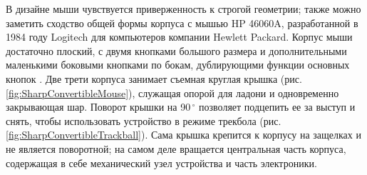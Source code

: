 \documentclass[11pt, a4paper]{article}
\begin{document}
В дизайне мыши чувствуется приверженность к строгой геометрии; также можно заметить сходство общей формы корпуса с мышью HP 46060A, разработанной в 1984 году Logitech для компьютеров компании Hewlett Packard. Корпус мыши достаточно плоский, с двумя кнопками большого размера и дополнительными маленькими боковыми кнопками по бокам, дублирующими функции основных кнопок \cite{JapaneseVintage}. Две трети корпуса занимает съемная круглая крышка (рис. \ref{fig:SharpConvertibleMouse}), служащая опорой для ладони и одновременно закрывающая шар. Поворот крышки на 90\,$^\circ$ позволяет подцепить ее за выступ и снять, чтобы использовать устройство в режиме трекбола (рис. \ref{fig:SharpConvertibleTrackball}). Сама крышка крепится к корпусу на защелках и не является поворотной; на самом деле вращается центральная часть корпуса, содержащая в себе механический узел устройства и часть электроники.
\end{document}
